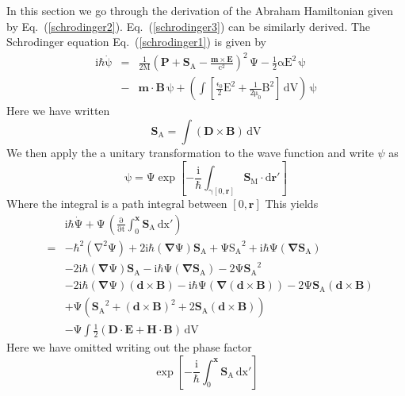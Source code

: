\documentclass[twocolumn,english,pra,aps,superscriptaddress,floatfix]{revtex4-1}
\begin{document}
In this section we go through the derivation of the Abraham Hamiltonian given by Eq.\ (\ref{schrodinger2}).  Eq.\ (\ref{schrodinger3}) can be similarly derived.  The Schrodinger equation Eq.\ (\ref{schrodinger1}) is given by
\begin{eqnarray}
\mathrm{i\hbar\dot{\psi}}&=&\mathrm{\frac{1}{2M}\left(\mathbf{P}+ \mathbf{S}_A-\frac{\mathbf{m}\times\mathbf{E}}{c^2}\right)^2\,\Psi-\frac{1}{2}\alpha E^2\,\psi}\nonumber \\
&-&\mathrm{\mathbf{m}\cdot\mathbf{B}\,\psi+\left(\int\left[\frac{\epsilon_0}{2}E^2+ \frac{1}{2\mu_0}B^2\right]\,dV\right)\,\psi}
\label{schrodingerappendix1}
\end{eqnarray}
Here we have written 
\begin{equation}
\mathrm{\mathbf{S}_A=\int \left(\mathbf{D}\times\mathbf{B}\right) \, dV}
\end{equation}
We then apply the a unitary transformation to the wave function and write $\psi$ as
\begin{equation}
\mathrm{\psi=\Psi\exp{\left[-\frac{\mathrm{i}}{\mathrm{\hbar}}\int_{\gamma[0,\mathbf{r}]}\mathbf{S}_M\cdot d\mathbf{r}'\right]}}
\label{abrahamrepappendix}
\end{equation}
Where the integral is a path integral between $[0,\mathrm{\mathbf{r}}]$
This yields
\begin{eqnarray}
&&\mathrm{\mathrm{i}\mathrm{\hbar}\dot{\Psi}+\Psi\,\left(\frac{\partial}{\partial t}\mathrm{\int_0^\mathbf{x} \mathbf{S}_A \, \mathrm{dx'}}\right)}\nonumber \\
&=&\mathrm{-\hbar^2(\nabla^2\Psi)+2i\hbar(\mathbf{\nabla}\Psi)\mathbf{S}_A+\Psi {S_A}^2+i\hbar\Psi(\mathbf{\nabla}\mathbf{S}_A)} \nonumber \\
&&\mathrm{-2i\hbar(\mathbf{\nabla}\Psi)\mathbf{S}_A-i\hbar\Psi(\mathbf{\nabla}\mathbf{S}_A)-2\Psi{\mathbf{S}_A}^2} \nonumber \\
&&\mathrm{-2i\hbar(\mathbf{\nabla}\Psi)(\mathbf{d}\times\mathbf{B})-i\hbar\Psi(\mathbf{\nabla}(\mathbf{d}\times\mathbf{B}))-2\Psi\mathbf{S}_A(\mathbf{d}\times\mathbf{B}) }\nonumber \\
&&\mathrm{+\Psi\left({\mathbf{S}_A}^2+(\mathbf{d}\times\mathbf{B})^2+2\mathbf{S}_A(\mathbf{d}\times\mathbf{B})\right)}\nonumber \\
&&\mathrm{-\Psi\int\frac{1}{2}\left(\mathbf{D\cdot E +H\cdot B}\right)\,dV}
\label{schrodingera2}
\end{eqnarray}
Here we have omitted writing out the phase factor 
\begin{equation}
\mathrm{\exp{\left[-\frac{\mathrm{i}}{\mathrm{\hbar}}\int_0^\mathbf{x}\mathbf{S}_A\,\mathrm{dx'}\right]}}
\label{phasefactor}
\end{equation}
\end{document}

